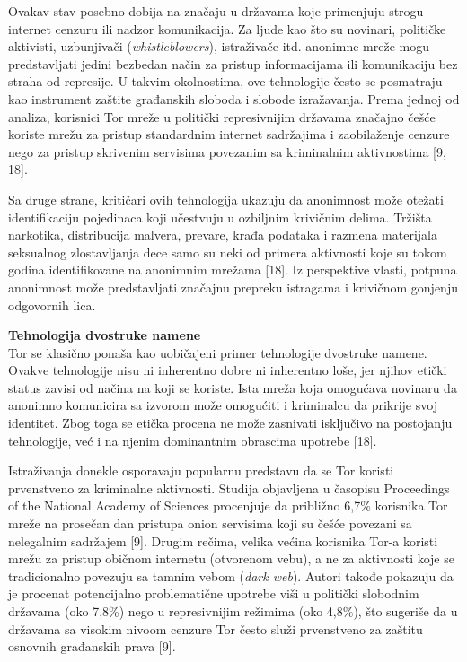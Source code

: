\documentclass[
]{article}
\begin{document}
Ovakav stav posebno dobija na značaju u državama koje primenjuju strogu
internet cenzuru ili nadzor komunikacija. Za ljude kao što su novinari,
političke aktivisti, uzbunjivači (\emph{whistleblowers}), istraživače itd. anonimne mreže
mogu predstavljati jedini bezbedan način za pristup informacijama ili
komunikaciju bez straha od represije. U takvim okolnostima, ove
tehnologije često se posmatraju kao instrument zaštite građanskih
sloboda i slobode izražavanja. Prema jednoj od analiza, korisnici Tor
mreže u politički represivnijim državama značajno češće koriste mrežu za
pristup standardnim internet sadržajima i zaobilaženje cenzure nego za
pristup skrivenim servisima povezanim sa kriminalnim aktivnostima [9,
18].

Sa druge strane, kritičari ovih tehnologija ukazuju da anonimnost može
otežati identifikaciju pojedinaca koji učestvuju u ozbiljnim krivičnim
delima. Tržišta narkotika, distribucija malvera, prevare, krađa podataka
i razmena materijala seksualnog zlostavljanja dece samo su neki od
primera aktivnosti koje su tokom godina identifikovane na anonimnim
mrežama [18]. Iz perspektive vlasti, potpuna anonimnost može
predstavljati značajnu prepreku istragama i krivičnom gonjenju
odgovornih lica.

\textbf{Tehnologija dvostruke namene}\\
Tor se klasično ponaša kao uobičajeni primer tehnologije dvostruke
namene. Ovakve tehnologije nisu ni inherentno dobre ni inherentno loše,
jer njihov etički status zavisi od načina na koji se koriste. Ista mreža
koja omogućava novinaru da anonimno komunicira sa izvorom može omogućiti
i kriminalcu da prikrije svoj identitet. Zbog toga se etička procena ne
može zasnivati isključivo na postojanju tehnologije, već i na njenim
dominantnim obrascima upotrebe [18].

Istraživanja donekle osporavaju popularnu predstavu da se Tor koristi
prvenstveno za kriminalne aktivnosti. Studija objavljena u časopisu
Proceedings of the National Academy of Sciences procenjuje da približno
6,7\% korisnika Tor mreže na prosečan dan pristupa onion servisima koji
su češće povezani sa nelegalnim sadržajem [9]. Drugim rečima, velika
većina korisnika Tor-a koristi mrežu za pristup običnom internetu (otvorenom vebu), a ne za aktivnosti koje se tradicionalno povezuju sa tamnim vebom (\emph{dark web}). Autori takođe pokazuju da je procenat potencijalno
problematične upotrebe viši u politički slobodnim državama (oko 7,8\%)
nego u represivnijim režimima (oko 4,8\%), što sugeriše da u državama sa
visokim nivoom cenzure Tor često služi prvenstveno za zaštitu osnovnih
građanskih prava [9].
\end{document}
